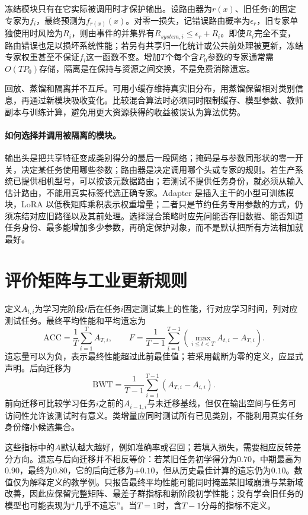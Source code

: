 冻结模块只有在它实际被调用时才保护输出。设路由器为$r(x)$、旧任务$i$的固定专家为$f_i$，最终预测为$f_{r(x)}(x)$。对零一损失，记错误路由概率为$\epsilon_r$，旧专家单独使用时风险为$R_i$，则由事件的并集界有$R_{system,i}\leq\epsilon_r+R_i$。即使$R_i$完全不变，路由错误也足以损坏系统性能；若另有共享归一化统计或公共前处理被更新，冻结专家权重甚至不保证$f_i$这一函数不变。增加$T$个每个含$P_0$参数的专家通常需$O(TP_0)$存储，隔离是在保持与资源之间交换，不是免费消除遗忘。

回放、蒸馏和隔离并不互斥。可用小缓存维持真实旧分布，用蒸馏保留相对类别信息，再通过新模块吸收变化。比较混合算法时必须同时限制缓存、模型参数、教师副本与训练计算，避免用更大资源获得的收益被误认为算法优势。

\paragraph{如何选择并调用被隔离的模块。}
输出头是把共享特征变成类别得分的最后一段网络；掩码是与参数同形状的零一开关，决定某任务使用哪些参数；路由器是决定调用哪个头或专家的规则。若生产系统已提供相机型号，可以按该元数据路由；若测试不提供任务身份，就必须从输入估计路由，不能用真实标签代选正确专家。Adapter 是插入主干的小型可训练模块，LoRA 以低秩矩阵乘积表示权重增量；二者只是节约任务专用参数的方式，仍须冻结对应旧路径以及其前处理。选择混合策略时应先问能否存旧数据、能否知道任务身份、最多能增加多少参数，再确定保护对象，而不是默认把所有方法相加就最好。

\section{评价矩阵与工业更新规则}
定义$A_{t,i}$为学习完阶段$t$后在任务$i$固定测试集上的性能，行对应学习时间，列对应测试任务。最终平均性能和平均遗忘为
\begin{equation}
 \mathrm{ACC}=\frac1T\sum_{i=1}^TA_{T,i},\qquad
 F=\frac1{T-1}\sum_{i=1}^{T-1}
 \left(\max_{i\leq t<T}A_{t,i}-A_{T,i}\right).
\end{equation}
遗忘量可以为负，表示最终性能超过此前最佳值；若采用截断为零的定义，应显式声明。后向迁移为
\begin{equation}
 \mathrm{BWT}=\frac1{T-1}\sum_{i=1}^{T-1}(A_{T,i}-A_{i,i}).
\end{equation}
前向迁移可比较学习任务$i$之前的$A_{i-1,i}$与未迁移基线，但仅在输出空间与任务可访问性允许该测试时有意义\cite{lopezpaz2017gem}。类增量应同时测试所有已见类别，不能利用真实任务身份缩小候选集合。

这些指标中的$A$默认越大越好，例如准确率或召回；若填入损失，需要相应反转差分方向。遗忘与后向迁移并不相反等价：若某旧任务初学得分为$0.70$，中期最高为$0.90$，最终为$0.80$，它的后向迁移为$+0.10$，但从历史最佳计算的遗忘仍为$0.10$。数值仅为解释定义的教学例。只报告最终平均性能可能同时掩盖某旧域崩溃与某新域改善，因此应保留完整矩阵、最差子群指标和新阶段初学性能；没有学会旧任务的模型也可能表现为“几乎不遗忘”。当$T=1$时，含$T-1$分母的指标不定义。

